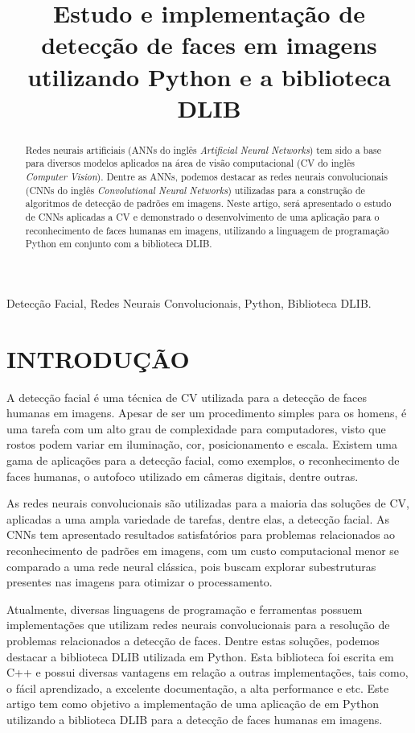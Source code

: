 \documentclass[conference]{IEEEtran}
\title{Estudo e implementação de detecção de faces em imagens utilizando Python e a biblioteca DLIB}
\author{
    \IEEEauthorblockN{José B. M. Trineto \\ Werberson P. da Silva}
    \IEEEauthorblockA{
        \textit{Universidade de Brasília - Departamento de Engenharia Elétrica}
    }
}
\begin{document}
    \maketitle
    
    \begin{abstract}
        Redes neurais artificiais (ANNs do inglês \textit{Artificial Neural Networks}) tem sido a base para diversos modelos aplicados na área de visão computacional (CV do inglês \textit{Computer Vision}). Dentre as ANNs, podemos destacar as redes neurais convolucionais (CNNs do inglês \textit{Convolutional Neural Networks}) utilizadas para a construção de algoritmos de detecção de padrões em imagens. Neste artigo, será apresentado o estudo de CNNs aplicadas a CV e demonstrado o desenvolvimento de uma aplicação para o reconhecimento de faces humanas em imagens, utilizando a linguagem de programação Python em conjunto com a biblioteca DLIB. 
    \end{abstract}
    
    \begin{IEEEkeywords}
     	  Detecção Facial, Redes Neurais Convolucionais, Python, Biblioteca DLIB.
	 \end{IEEEkeywords}
	
    \section{INTRODUÇÃO}
		A detecção facial é uma técnica de CV utilizada para a detecção de faces humanas em imagens.	Apesar de ser um procedimento simples para os homens, é uma tarefa com um alto grau de complexidade para computadores, visto que rostos podem variar em iluminação, cor, posicionamento e escala. Existem uma gama de aplicações para a detecção facial, como exemplos, o reconhecimento de faces humanas, o autofoco utilizado em câmeras digitais, dentre outras.
		
	    As redes neurais convolucionais são utilizadas para a maioria das soluções de CV, aplicadas a uma ampla variedade de tarefas, dentre elas, a detecção facial. As CNNs tem apresentado resultados satisfatórios para problemas relacionados ao reconhecimento de padrões em imagens, com um custo computacional menor se comparado a uma rede neural clássica, pois buscam explorar subestruturas presentes nas imagens para otimizar o processamento.
	    
		Atualmente, diversas linguagens de programação e ferramentas possuem implementações que utilizam redes neurais convolucionais para a resolução de problemas relacionados a detecção de faces. Dentre estas soluções, podemos destacar a biblioteca DLIB utilizada em Python. Esta biblioteca foi escrita em C++ e possui diversas vantagens em relação a outras implementações, tais como, o fácil aprendizado, a excelente documentação, a alta performance e etc. Este artigo tem como objetivo a implementação de uma aplicação de em Python utilizando a biblioteca DLIB para a detecção de faces humanas em imagens.
		
\end{document}
